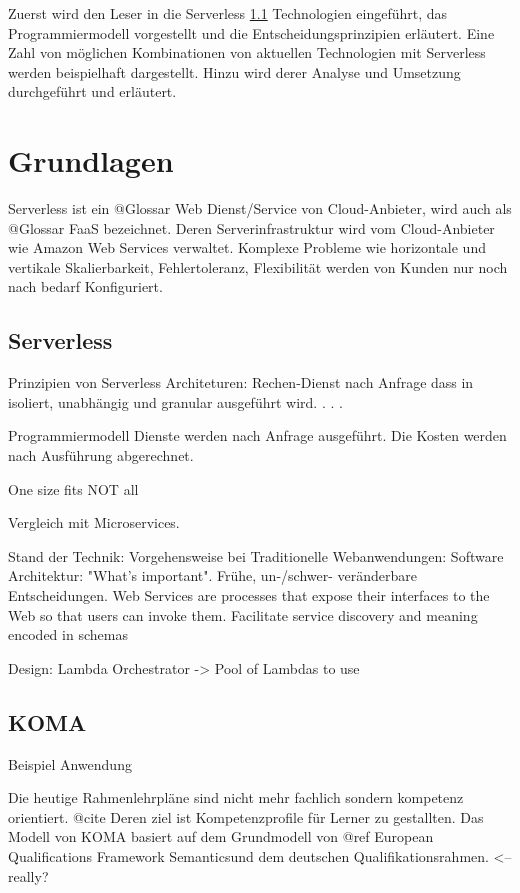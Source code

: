 \documentclass[
12pt,
english,
ngerman,
headsepline,
twoside,
openright,
numbers=noenddot,version=first
]{scrreprt}
\begin{document}
Zuerst wird den Leser in die Serverless \ref{sec:serverless} Technologien eingeführt, das Programmiermodell vorgestellt
und die Entscheidungsprinzipien erläutert.
Eine Zahl von möglichen Kombinationen von aktuellen Technologien mit Serverless werden beispielhaft dargestellt.
Hinzu wird derer Analyse und Umsetzung durchgeführt und erläutert.

\chapter{Grundlagen}
\label{chap:principles}

Serverless ist ein @Glossar Web Dienst/Service von Cloud-Anbieter, wird auch als @Glossar FaaS bezeichnet. Deren Serverinfrastruktur wird vom Cloud-Anbieter wie Amazon Web Services verwaltet. Komplexe Probleme wie horizontale und vertikale Skalierbarkeit, Fehlertoleranz, Flexibilität werden von Kunden nur noch nach bedarf Konfiguriert. 


\section{Serverless}
\label{sec:serverless}
Prinzipien von Serverless Architeturen: \cite{sbarski2017serverless}
Rechen-Dienst nach Anfrage dass in isoliert, unabhängig und granular ausgeführt wird. 
. . .



Programmiermodell 
Dienste werden nach Anfrage ausgeführt. 
Die Kosten werden nach Ausführung abgerechnet. 

One size fits NOT all

Vergleich mit Microservices.


Stand der Technik: 
Vorgehensweise bei Traditionelle Webanwendungen:  
Software Architektur: "What's important". Frühe, un-/schwer- veränderbare Entscheidungen.
Web Services are processes that expose their interfaces to the Web so that users can invoke them. Facilitate service discovery and meaning encoded in schemas


Design: Lambda Orchestrator -> Pool of Lambdas to use

\section{KOMA}{Beispiel Anwendung}
\label{sec:KOMA}

Die heutige Rahmenlehrpläne sind nicht mehr fachlich sondern kompetenz orientiert. @cite Deren ziel ist Kompetenzprofile
für Lerner zu gestallten. Das Modell von KOMA basiert auf dem Grundmodell von
@ref \glqq European Qualifications Framework Semantics\grqq und dem deutschen Qualifikationsrahmen. <-- really?
\end{document}
